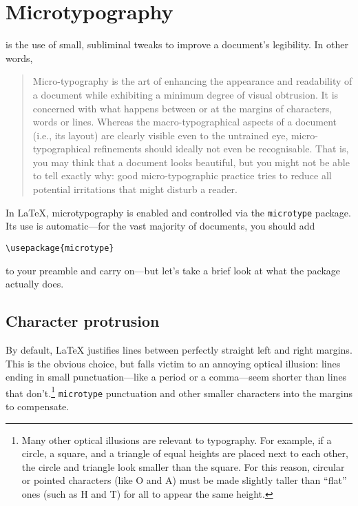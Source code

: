 \chapter{Microtypography}

 is the use of small, subliminal tweaks to improve
a document's legibility.
In other words,
\begin{quote}
Micro-typography is the art of enhancing the appearance and readability of a
document while exhibiting a minimum degree of visual obtrusion.
It is concerned with what happens between or at the margins of characters,
words or lines. Whereas the macro-typographical aspects of a document
(i.e., its layout) are clearly visible even to the untrained eye,
micro-typographical refinements should ideally not even be recognisable.
That is, you may think that a document looks beautiful, but you
might not be able to tell exactly why: good micro-typographic practice tries to
reduce all potential irritations that might disturb a reader.\punckern{}
\end{quote}

In \LaTeX{}, microtypography is enabled and controlled via the
\texttt{microtype} package.
Its use is automatic---for the vast majority of documents, you should add
\begin{leftfigure}
\begin{lstlisting}
\usepackage{microtype}
\end{lstlisting}
\end{leftfigure}
to your preamble and carry on---but let's take a brief look at what the package
actually does.

\section{Character protrusion}

By default, \LaTeX{} justifies lines between perfectly straight
left and right margins.
This is the obvious choice,
but falls victim to an annoying optical illusion:
lines ending in small punctuation---like a period or a
comma---seem shorter than lines that
don't.\punckern\footnote{Many other optical illusions are
relevant to typography. For example, if a circle, a square, and a triangle
of equal heights are placed next to each other,
the circle and triangle look smaller than the square.
For this reason, circular or pointed characters (like O and A) must
be made slightly taller than ``flat'' ones (such as H and T) for all
to appear the same height.\punckern{}}
\texttt{microtype}  punctuation and other smaller
characters into the margins to compensate.

